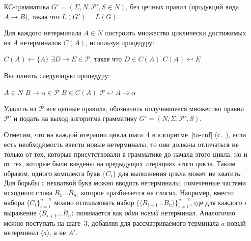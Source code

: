 {КС-грамматика
$G'=(\Sigma, N, \mathcal P', S \in N)$, без цепных правил (продукций вида $A \to B$), такая что $L(G')=L(G)$.}
{
  \item Для каждого нетерминала $A \in N$ построить множество циклически
  достижимых из $A$ нетерминалов $C(A)$, используя процедуру:
  \begin{codebox}
  \li   $C(A) \gets \{ A \}$
  \li   \While $\exists D \to E \in \mathcal P$, такая что $D \in C(A)$
  \zi   \Do
        $C(A) \hookleftarrow E$
        \End
  \end{codebox}
  \item Выполнить следующую процедуру:
  \begin{codebox}
  \zi   \For $A \in N$
  \zi   \Do \For $B \to \alpha \in \mathcal P$
  \zi       \Do \If $B \in C(A)$
  \zi           \Then $\mathcal P \hookleftarrow A \to \alpha$
                \End
            \End
        \End
  \end{codebox}
  \item Удалить из $\mathcal P$ все цепные правила, обозначить
  получившееся множество правил $\mathcal P'$ и подать на выход алгоритма
  грамматику $G' = (N, \Sigma, \mathcal P', S)$.
}

\begin{myremark}
Отметим, что на каждой итерации цикла шага~4 в алгоритме~\ref{to-cnf} 
(с.~\pageref{to-cnf}), если
есть необходимость ввести новые не\-тер\-ми\-на\-лы, то они должны отличаться не только
от тех, которые присутствовали в грамматике до начала этого цикла, но и от тех,
которые были введены на предыдущих итерациях этого цикла. Таким образом, одного
комплекта букв $\{C_i\}$ для выполнения цикла может не хватить. Для борьбы с
нехваткой букв можно вводить нетерминалы, помеченные частями исходного слова
$B_1\ldots B_n$, которое «разбивается на слоги». Например, вместо набора
$\{C_i\}_{i=1}^{n-2}$ можно использовать набор $\{ \langle B_{i+1}\ldots B_n
\rangle \}_{i=1}^{n-2}$, где для каждого $i$ выражение $\langle B_{i+1}\ldots B_n \rangle$
понимается как \emph{один новый} нетерминал. Аналогично можно поступать на
шаге~3, добавляя для рассматриваемого терминала $a$ новый
нетерминал $\langle a \rangle$, а не $A'$.
\end{myremark}

